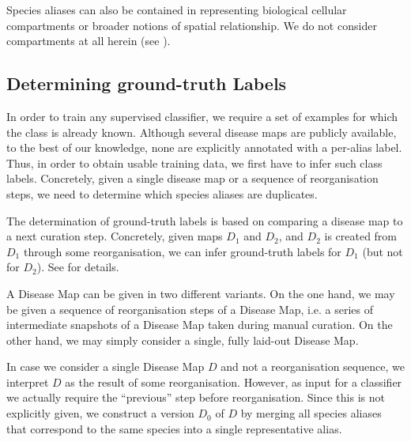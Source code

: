 \documentclass[
	fontsize=10pt, %
	twoside=false, %
	secnumdepth=1, %
  toc=indentunnumbered %
]{kaobook}
\begin{document}
Species aliases can also be contained in  representing
biological cellular compartments or broader notions of spatial relationship. We
do not consider compartments at all herein (see ).





\subsection{Determining ground-truth Labels}
\label{sec:determining-labels}

In order to train any supervised classifier, we require a set of examples for
which the class is already known. Although several disease maps are publicly
available, to the best of our knowledge, none are explicitly annotated with a
per-alias label. Thus, in order to obtain usable training data, we first have to
infer such class labels. Concretely, given a single disease map or a sequence of
reorganisation steps, we need to determine which species aliases are duplicates.

The determination of ground-truth labels is based on comparing a disease map to
a next curation step. Concretely, given maps $D_1$ and $D_2$, and $D_2$ is
created from $D_1$ through some reorganisation, we can infer ground-truth
labels for $D_1$ (but not for $D_2$). See  for details.

A Disease Map can be given in two different variants. On the one hand, we may be
given a sequence of reorganisation steps of a Disease Map, i.e. a series of intermediate
snapshots of a Disease Map taken during manual curation. On the other hand, we
may simply consider a single, fully laid-out Disease Map.

In case we consider a single Disease Map $D$ and not a reorganisation sequence,
we interpret $D$ as the result of some reorganisation. However, as input for a
classifier we actually require the ``previous'' step before reorganisation.
Since this is not explicitly given, we construct a  version $D_0$
of $D$ by merging all species aliases that correspond to the same species into a
single representative alias.
\end{document}
